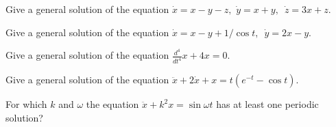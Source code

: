 \begin{task}
	Give a general solution of the equation $\dot{x}=x-y-z,$ $\dot{y}=x+y,$\ $\dot{z}=3x+z.$
\end{task}

\begin{task}
	Give a general solution of the equation $\dot{x} = x-y+1/\cos t,$\ $\dot{y}=2x-y.$
\end{task}

\begin{task}
	Give a general solution of the equation $\frac{d^{4}}{dt^{4}}x +4x=0.$
\end{task}

\begin{task}
	Give a general solution of the equation $\ddot{x}+2\dot{x}+x=t(e^{-t}-\cos t)$.
\end{task}

\begin{task}
	For which $k$ and $\omega$ the equation $\ddot{x} +k^{2}x= \sin \omega t$ has at least one periodic solution?
\end{task}